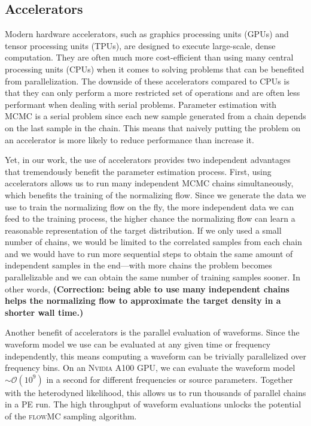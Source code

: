 \documentclass[twocolumn]{aastex631}
\newcommand{\corr}[1]{\textbf{\color{pyRed}(Correction: #1)}}
\begin{document}
\subsection{Accelerators}
\label{sec:accelerators}

Modern hardware accelerators, such as graphics processing units (GPUs) and
tensor processing units (TPUs), are designed to execute large-scale, dense
computation. They are often much more cost-efficient than using many central
processing units (CPUs) when it comes to solving problems that can be benefited
from parallelization.  The downside of these accelerators compared to CPUs is
that they can only perform a more restricted set of operations and are often
less performant when dealing with serial problems. Parameter estimation with
MCMC is a serial problem since each new sample generated from a chain depends
on the last sample in the chain. This means that naively putting the problem on
an accelerator is more likely to reduce performance than increase it.

Yet, in our work, the use of accelerators provides two independent advantages
that tremendously benefit the parameter estimation process. First, using
accelerators allows us to run many independent MCMC chains simultaneously, which
benefits the training of the normalizing flow. Since we generate the data we use
to train the normalizing flow on the fly, the more independent data we can feed
to the training process, the higher chance the normalizing flow can learn a
reasonable representation of the target distribution.  If we only used a small
number of chains, we would be limited to the correlated samples from each chain
and we would have to run more sequential steps to obtain the same amount of
independent samples in the end---with more chains the problem becomes
parallelizable and we can obtain the same number of training samples sooner. In
other words, \corr{being able to use many independent chains helps the normalizing
flow to approximate the target density in a shorter wall time.}

Another benefit of accelerators is the parallel evaluation of waveforms. Since
the waveform model we use can be evaluated at any given time or frequency
independently, this means computing a waveform can be trivially parallelized
over frequency bins. On an \textsc{Nvidia} A100 GPU, we can evaluate the
waveform model $\sim \mathcal{O}(10^9)$ in a second for different
frequencies or source parameters. Together with the heterodyned likelihood, this
allows us to run thousands of parallel chains in a PE run. The high throughput
of waveform evaluations unlocks the potential of the \textsc{flowMC} sampling
algorithm. 
\end{document}
